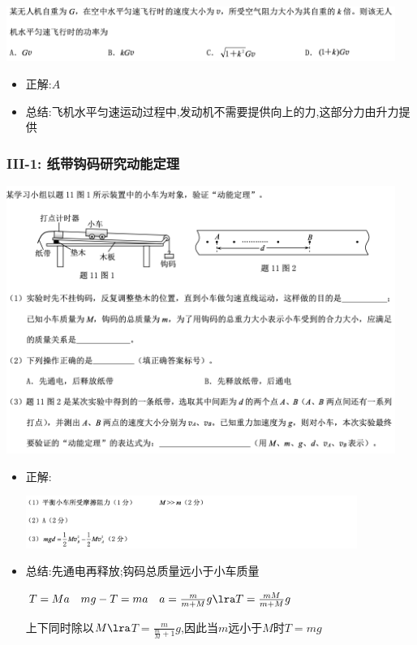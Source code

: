 \documentclass{article}
\begin{document}
\includegraphics[width=0.95\textwidth,keepaspectratio]{./pictures/1.7-1.png}


\begin{itemize}
    \item 正解:\quad $A$
    \item 总结:\quad 飞机水平匀速运动过程中,发动机不需要提供向上的力,这部分力由升力提供
\end{itemize}

\subsubsection{III-1: 纸带钩码研究动能定理}
\includegraphics[width=0.95\textwidth,keepaspectratio]{./pictures/1.7-2.png}

\begin{itemize}
    \item 正解:\quad 
    
    \includegraphics[width=0.85\textwidth,keepaspectratio]{./pictures/1.7-3.png}

    \item 总结:\quad 先通电再释放;钩码总质量远小于小车质量
    
    \hspace{3.2em}$T = Ma \quad mg - T = ma \quad a = \frac{m}{m+M}g \lra T = \frac{mM}{m+M}g$

    \hspace{3.2em}上下同时除以$M \lra$$T = \frac{m}{\frac{m}{M}+1}g$,因此当$m$远小于$M$时$T = mg$
\end{itemize}
\end{document}
